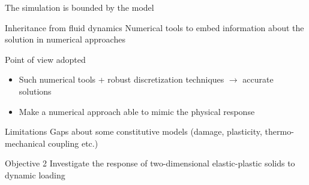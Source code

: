 \begin{frame}{The simulation is bounded by the model}
  \begin{block}{Inheritance from fluid dynamics}
    Numerical tools to embed information about the solution in numerical approaches
  \end{block}
  \begin{block}{Point of view adopted}
    \begin{itemize}
    \item Such numerical tools + robust discretization techniques $\rightarrow$ accurate solutions
    \item Make a numerical approach able to mimic the physical response
    \end{itemize}
  \end{block}
  \begin{block}{Limitations}
    Gaps about some constitutive models (damage, plasticity, thermo-mechanical coupling etc.)
  \end{block}
  \begin{block}{Objective 2}
    Investigate the response of two-dimensional elastic-plastic solids to dynamic loading
  \end{block}
\end{frame}



